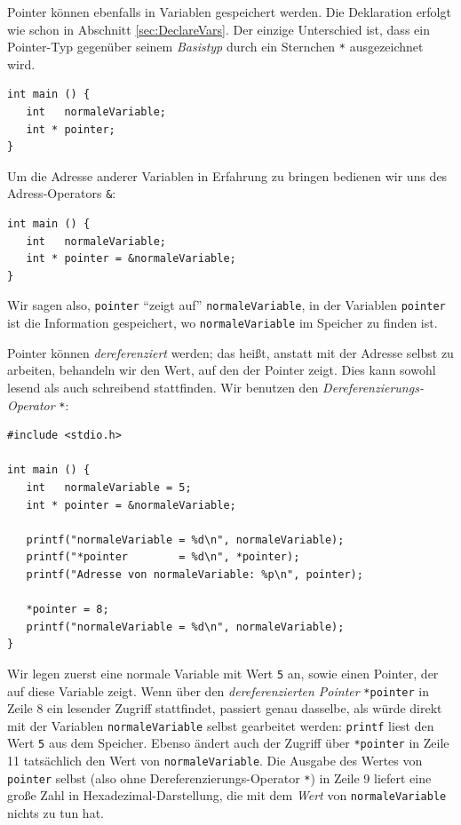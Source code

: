Pointer können ebenfalls in Variablen gespeichert werden. Die Deklaration erfolgt wie schon in Abschnitt \ref{sec:DeclareVars}. Der einzige Unterschied ist, dass ein Pointer-Typ gegenüber seinem \emph{Basistyp} durch ein Sternchen \texttt{*} ausgezeichnet wird.

\begin{codebox}
\begin{verbatim}
int main () {
   int   normaleVariable;
   int * pointer;
}
\end{verbatim}
\end{codebox}

Um die Adresse anderer Variablen in Erfahrung zu bringen bedienen wir uns des Adress-Operators \texttt{\&}:

\begin{codebox}
\begin{verbatim}
int main () {
   int   normaleVariable;
   int * pointer = &normaleVariable;
}
\end{verbatim}
\end{codebox}

Wir sagen also, \texttt{pointer} \enquote{zeigt auf} \texttt{normaleVariable}, \ie in der Variablen \texttt{pointer} ist die Information gespeichert, wo \texttt{normaleVariable} im Speicher zu finden ist.

Pointer können \emph{dereferenziert} werden; das heißt, anstatt mit der Adresse selbst zu arbeiten, behandeln wir den Wert, auf den der Pointer zeigt. Dies kann sowohl lesend als auch schreibend stattfinden. Wir benutzen den \emph{Dereferenzierungs-Operator} \texttt{*}:

\begin{codebox}
\begin{verbatim}
#include <stdio.h>

int main () {
   int   normaleVariable = 5;
   int * pointer = &normaleVariable;

   printf("normaleVariable = %d\n", normaleVariable);
   printf("*pointer        = %d\n", *pointer);
   printf("Adresse von normaleVariable: %p\n", pointer);

   *pointer = 8;
   printf("normaleVariable = %d\n", normaleVariable);
}
\end{verbatim}
\end{codebox}

Wir legen zuerst eine normale Variable mit Wert \texttt{5} an, sowie einen Pointer, der auf diese Variable zeigt. Wenn über den \emph{dereferenzierten Pointer} \texttt{*pointer} in Zeile 8 ein lesender Zugriff stattfindet, passiert genau dasselbe, als würde direkt mit der Variablen \texttt{normaleVariable} selbst gearbeitet werden: \texttt{printf} liest den Wert \texttt{5} aus dem Speicher.
Ebenso ändert auch der Zugriff über \texttt{*pointer} in Zeile 11 tatsächlich den Wert von \texttt{normaleVariable}. Die Ausgabe des Wertes von \texttt{pointer} selbst (also ohne Dereferenzierungs-Operator \texttt{*}) in Zeile 9 liefert eine große Zahl in Hexadezimal-Darstellung, die mit dem \emph{Wert} von \texttt{normaleVariable} nichts zu tun hat.

